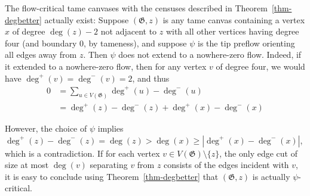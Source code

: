 \documentclass{article}
\newcommand\g{\mathfrak{G}}
\begin{document}
The flow-critical tame canvases with the censuses described in Theorem~\ref{thm-degbetter} actually exist:
Suppose $(\g,z)$ is any tame canvas containing a vertex $x$ of degree $\deg(z)-2$ not adjacent to $z$ with all other vertices having degree four
(and boundary $0$, by tameness), and suppose $\psi$ is the tip preflow orienting all edges away from $z$.
Then $\psi$ does not extend to a nowhere-zero flow.  Indeed, if it extended to  a nowhere-zero flow,
then for any vertex $v$ of degree four, we would have $\deg^+(v)=\deg^-(v)=2$, and thus 
\begin{align*}
    0 & =\sum_{u\in V(\g)} \deg^+ (u)-\deg^-(u)\\ 
    & = \deg^+ (z)-\deg^- (z)+\deg^+ (x)-\deg^-(x)
\end{align*}

However, the choice of $\psi$ implies $\deg^+(z)-\deg^-(z)=\deg(z) >\deg(x) \ge |\deg^+(x)-\deg^-(x)|$,
which is a contradiction.  If for each vertex $v\in V(\g)\setminus\{z\}$, the only edge cut of size at
most $\deg(v)$ separating $v$ from $z$ consists of the edges incident with $v$, it is easy to conclude
using Theorem~\ref{thm-degbetter} that $(\g,z)$ is actually $\psi$-critical.
\end{document}
